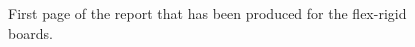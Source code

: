 \begin{figure}[ht]
    \centering
    \caption{First page of the report that has been produced for the flex-rigid boards.}
    \label{figFLEXreport}
\end{figure}

